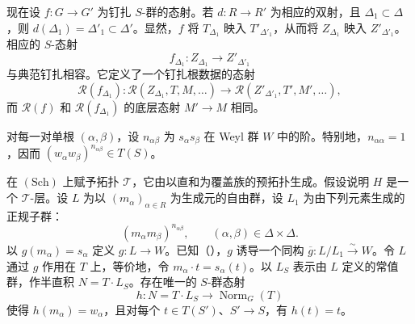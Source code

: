 现在设 \(f:G\to G'\) 为钉扎 \(S\)-群的态射。若 \(d:R\to R'\) 为相应的双射，且 \(\Delta_1\subset\Delta\)，则 \(d(\Delta_1)=\Delta'_1\subset\Delta'\)。显然，\(f\) 将 \(T_{\Delta_1}\) 映入 \(T'_{\Delta'_1}\)，从而将 \(Z_{\Delta_1}\) 映入 \(Z'_{\Delta'_1}\)。相应的 \(S\)-态射
\[
  f_{\Delta_1}:Z_{\Delta_1}\longrightarrow Z'_{\Delta'_1}
\]
与典范钉扎相容。它定义了一个钉扎根数据的态射
\[
  \mathscr R(f_{\Delta_1}):
  \mathscr R(Z_{\Delta_1},T,M,\ldots)
  \longrightarrow
  \mathscr R(Z'_{\Delta'_1},T',M',\ldots),
\]
而 \(\mathscr R(f)\) 和 \(\mathscr R(f_{\Delta_1})\) 的底层态射 \(M'\to M\) 相同。


对每一对单根 \((\alpha,\beta)\)，设 \(n_{\alpha\beta}\) 为 \(s_\alpha s_\beta\) 在 Weyl 群 \(W\) 中的阶。特别地，\(n_{\alpha\alpha}=1\)，因而 \((w_\alpha w_\beta)^{n_{\alpha\beta}}\in T(S)\)。



\SGAProof
在 \((\mathrm{Sch})\) 上赋予拓扑 \(\mathcal T\)，它由以直和为覆盖族的预拓扑生成。假设说明 \(H\) 是一个 \(\mathcal T\)-层。设 \(L\) 为以 \((m_\alpha)_{\alpha\in R}\) 为生成元的自由群，设 \(L_1\) 为由下列元素生成的正规子群：
\[
  (m_\alpha m_\beta)^{n_{\alpha\beta}},
  \qquad(\alpha,\beta)\in\Delta\times\Delta.
\]
以 \(g(m_\alpha)=s_\alpha\) 定义 \(g:L\to W\)。已知（），\(g\) 诱导一个同构 \(\overline g:L/L_1\xrightarrow{\sim}W\)。令 \(L\) 通过 \(g\) 作用在 \(T\) 上，等价地，令 \(m_\alpha\cdot t=s_\alpha(t)\)。以 \(L_S\) 表示由 \(L\) 定义的常值群，作半直积 \(N=T\cdot L_S\)。存在唯一的 \(S\)-群态射
\[
  h:N=T\cdot L_S\longrightarrow\operatorname{Norm}_G(T)
\]
使得 \(h(m_\alpha)=w_\alpha\)，且对每个 \(t\in T(S')\)、\(S'\to S\)，有 \(h(t)=t\)。

